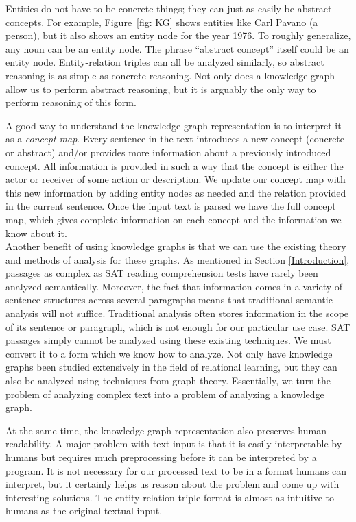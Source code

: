 \documentclass[pageno]{final_paper}
\begin{document}
Entities do not have to be concrete things; they can just as easily be abstract
concepts. For example, Figure~\ref{fig: KG} shows entities like Carl Pavano (a
person), but it also shows an entity node for the year 1976. To roughly
generalize, any noun can be an entity node. The phrase ``abstract concept''
itself could be an entity node. Entity-relation triples can all be analyzed
similarly, so abstract reasoning is as simple as concrete reasoning. Not only
does a knowledge graph allow us to perform abstract reasoning, but it is
arguably the only way to perform reasoning of this form.

A good way to understand the knowledge graph representation is to interpret it
as a \textit{concept map}. Every sentence in the text introduces a new concept
(concrete or abstract) and/or provides more information about a previously
introduced concept. All information is provided in such a way that the concept
is either the actor or receiver of some action or description. We update our
concept map with this new information by adding entity nodes as needed and the
relation provided in the current sentence. Once the input text is parsed we have
the full concept map, which gives complete information on each concept and the
information we know about it. \\

Another benefit of using knowledge graphs is that we can use the existing theory
and methods of analysis for these graphs. As mentioned in Section
\ref{Introduction}, passages as complex as SAT reading comprehension tests have
rarely been analyzed semantically. Moreover, the fact that information comes in
a variety of sentence structures across several paragraphs means that
traditional semantic analysis will not suffice. Traditional analysis often
stores information in the scope of its sentence or paragraph, which is not
enough for our particular use case. SAT passages simply cannot be analyzed using
these existing techniques. We must convert it to a form which we know how to
analyze. Not only have knowledge graphs been studied extensively in the field of
relational learning, but they can also be analyzed using techniques from graph
theory. Essentially, we turn the problem of analyzing complex text into a
problem of analyzing a knowledge graph.

At the same time, the knowledge graph representation also preserves human
readability. A major problem with text input is that it is easily interpretable
by humans but requires much preprocessing before it can be interpreted by a
program. It is not necessary for our processed text to be in a format humans can
interpret, but it certainly helps us reason about the problem and come up with
interesting solutions. The entity-relation triple format is almost as intuitive
to humans as the original textual input.
\end{document}
